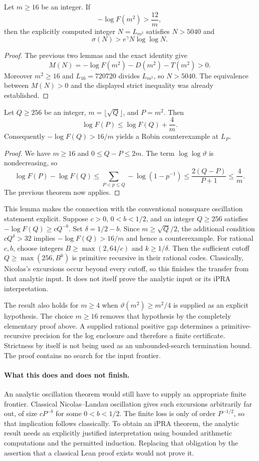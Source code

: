\begin{theorem}
Let $m\ge16$ be an integer. If
\[
 -\log F(m^2)>\frac{12}m,
\]
then the explicitly computed integer $N=L_{m^2}$ satisfies $N>5040$ and
\[
 \sigma(N)>e^\gamma N\log\log N.
\]
\end{theorem}
\begin{proof}
The previous two lemmas and the exact identity give
\[
 M(N)=-\log F(m^2)-D(m^2)-T(m^2)>0.
\]
Moreover $m^2\ge16$ and $L_{16}=720720$ divides $L_{m^2}$, so $N>5040$.
The equivalence between $M(N)>0$ and the displayed strict inequality was
already established.
\end{proof}

\begin{lemma}
Let $Q\ge256$ be an integer, $m=\lfloor\sqrt Q\rfloor$, and $P=m^2$.
Then
\[
 \log F(P)\le\log F(Q)+\frac4m.
\]
Consequently $-\log F(Q)>16/m$ yields a Robin counterexample at $L_P$.
\end{lemma}
\begin{proof}
We have $m\ge16$ and $0\le Q-P\le2m$.
The term $\log\log\vartheta$ is nondecreasing, so
\[
 \log F(P)-\log F(Q)
 \le\sum_{P<p\le Q}-\log(1-p^{-1})
 \le\frac{2(Q-P)}{P+1}\le\frac4m.
\]
The previous theorem now applies.
\end{proof}

This lemma makes the connection with the conventional nonsquare oscillation
statement explicit. Suppose $c>0$, $0<b<1/2$, and an integer $Q\ge256$
satisfies $-\log F(Q)\ge cQ^{-b}$. Set $\delta=1/2-b$.
Since $m\ge\sqrt Q/2$, the additional condition $cQ^\delta>32$ implies
$-\log F(Q)>16/m$ and hence a counterexample. For rational $c,b$, choose
integers $B\ge\max(2,64/c)$ and $k\ge1/\delta$. Then the sufficient
cutoff $Q\ge\max(256,B^k)$ is primitive recursive in their rational codes.
Classically, Nicolas's excursions occur beyond every cutoff, so this
finishes the transfer from that analytic input. It does not itself prove
the analytic input or its iPRA interpretation.

The result also holds for $m\ge4$ when $\vartheta(m^2)\ge m^2/4$ is supplied
as an explicit hypothesis. The choice $m\ge16$ removes that hypothesis by
the completely elementary proof above. A supplied rational positive
gap determines a primitive-recursive precision for the log enclosure
and therefore a finite certificate. Strictness by itself is not being
used as an unbounded-search termination bound. The proof contains no
search for the input frontier.

\paragraph{What this does and does not finish.}
An analytic oscillation theorem would still have to supply an appropriate
finite frontier. Classical Nicolas--Landau oscillation gives such excursions
arbitrarily far out, of size $cP^{-b}$ for some $0<b<1/2$. The finite loss
is only of order $P^{-1/2}$, so that implication follows classically. To
obtain an iPRA theorem, the analytic result needs an explicitly justified
interpretation using bounded arithmetic computations and the permitted
induction. Replacing that obligation by the assertion that a classical Lean
proof exists would not prove it.
